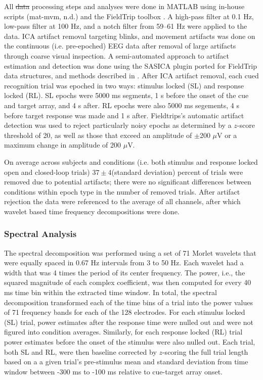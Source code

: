 \documentclass[11pt, titlepage, twoside]{article}
\providecommand{\DIFadd}[1]{{\protect\color{blue}\uwave{#1}}} %
\providecommand{\DIFdel}[1]{{\protect\color{red}\sout{#1}}}                      %
\providecommand{\DIFaddbegin}{} %
\providecommand{\DIFaddend}{} %
\providecommand{\DIFdelbegin}{} %
\providecommand{\DIFdelend}{} %
\begin{document}
All \DIFdelbegin \DIFdel{data }\DIFdelend \DIFaddbegin \DIFadd{EEG data was taken from retrieval trials where all }\DIFaddend processing steps and analyses were done in MATLAB using in-house scripts (mat-mvm, n.d.) and the FieldTrip toolbox \cite{OostenveldFriesMarisEtAl11}. A high-pass filter at 0.1 Hz, low-pass filter at 100 Hz, and a notch filter from 59--61 Hz were applied to the data.  ICA artifact removal targeting blinks, and movement artifacts was done on the continuous (i.e. pre-epoched) EEG data after removal of large artifacts through coarse visual inspection.  A semi-automated approach to artifact estimation and detection was done using the SASICA plugin ported for FieldTrip data structures, and methods described in \textcite{ChaumonBishopBusch15}.  After ICA artifact removal, each cued recognition trial was epoched in two ways: stimulus locked (SL) and response locked (RL).  SL epochs were 5000 ms segments, 1 s before the onset of the cue and target array, and 4 s after. RL epochs were also 5000 ms segements, 4 s before target response was made and 1 s after.  Fieldtrips's automatic artifact detection was used to reject particularly noisy epochs as determined by a $z$-score threshold of 20, as well as those that exceed an amplitude of $\pm$200 $\mu$V or a maximum change in amplitude of 200 $\mu$V. 

On average across subjects and conditions (i.e. both stimulus and response locked open and closed-loop trials) $37\pm4$(standard deviation) percent of trials were removed due to potential artifacts; there were no significant differences between conditions within epoch type in the number of removed trials.  After artifact rejection the data were referenced to the average of all channels, after which wavelet based time frequency decompositions were done.

\subsubsection{Spectral Analysis}
\label{sec:deevSpecAnal}
The spectral decomposition was performed using a set of 71 Morlet wavelets that were equally spaced in 0.67 Hz intervals from 3 to 50 Hz. Each wavelet had a width that was 4 times the period of its center frequency. The power, i.e., the squared magnitude of each complex coefficient, was then computed for every 40 ms time bin within the extracted time window. In total, the spectral decomposition transformed each of the time bins of a trial into the power values of 71 frequency bands for each of the 128 electrodes.  For each stimulus locked (SL) trial, power estimates after the response time were nulled out and were not figured into condition averages.  Similarly, for each response locked (RL) trial power estimates before the onset of the stimulus were also nulled out.  Each trial, both SL and RL, were then baseline corrected by $z$-scoring the full trial length based on a a given trial's pre-stimulus mean and standard deviation from time window between -300 ms to -100 ms relative to cue-target array onset.  
\end{document}

